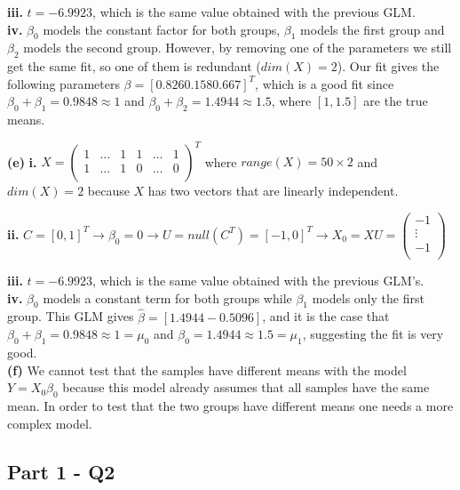 \documentclass[11pt,a4paper,oneside]{report}
\begin{document}
\textbf{iii. } $t = -6.9923$, which is the same value obtained with the previous GLM. \\

\textbf{iv. } $\beta_0$ models the constant factor for both groups, $\beta_1$ models the first group and $\beta_2$ models the second group. However, by removing one of the parameters we still get the same fit, so one of them is redundant ($dim(X) = 2$). Our fit gives the following parameters $\beta = [0.826 0.158 0.667]^T$, which is a good fit since $\beta_0 + \beta_1 = 0.9848 \approx 1$ and $\beta_0 + \beta_2 = 1.4944 \approx 1.5$, where $[1, 1.5]$ are the true means. 

\noindent \large{\textbf{(e)}} \textbf{i. } $X = \begin{pmatrix}
1 & \dots & 1 & 1 & \dots & 1\\
1 & \dots & 1 & 0 & \dots & 0\\
\end{pmatrix}^T$ where $range(X) = 50 \times 2$ and $dim(X) = 2$ because $X$ has two vectors that are linearly independent.

\textbf{ii. } $C = [0, 1]^T \to \beta_0 = 0 \to U = null(C^T) = [-1, 0]^T \to X_0 = X U = \begin{pmatrix}
-1\\
\vdots\\
-1\\
\end{pmatrix}$

\textbf{iii. } $t = -6.9923$, which is the same value obtained with the previous GLM's. \\

\textbf{iv. } $\beta_0$ models a constant term for both groups while $\beta_1$ models only the first group. This GLM gives $\hat{\beta} = [1.4944 -0.5096]$, and it is the case that $\beta_0 + \beta_1 = 0.9848 \approx 1 = \mu_0$ and $\beta_0 = 1.4944 \approx 1.5 = \mu_1$, suggesting the fit is very good.\\

\noindent \large{\textbf{(f)}} We cannot test that the samples have different means with the model $Y=X_0\beta_0$ because this model already assumes that all samples have the same mean. In order to test that the two groups have different means one needs a more complex model.\\

\subsection*{Part 1 - Q2}
\end{document}
